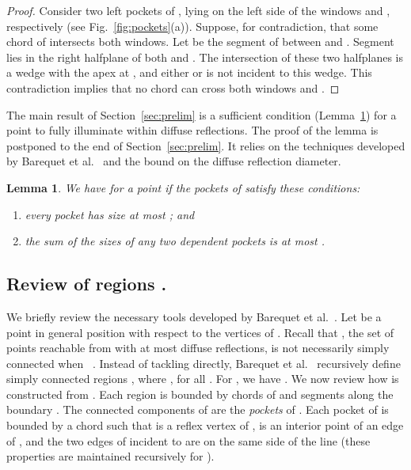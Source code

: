 \documentclass[12pt]{article}
\newtheorem{lemma}{Lemma}
\begin{document}
\begin{proof}
Consider two left pockets of , lying on the left side of the windows  and , respectively (see Fig.~\ref{fig:pockets}(a)). Suppose, for contradiction, that some chord  of  intersects both windows. Let  be the segment of  between  and . Segment  lies in the right halfplane of both  and . The intersection of these two halfplanes is a wedge with the apex at , and either  or  is not incident to this wedge.
This contradiction implies that no chord  can cross both windows  and .
\end{proof}
The main result of Section~\ref{sec:prelim} is a sufficient condition (Lemma~\ref{lem:condition})
for a point  to fully illuminate  within 
diffuse reflections.
The proof of the lemma is postponed to the end of Section~\ref{sec:prelim}.
It relies on the techniques developed by Barequet et al.~\cite{Us} and the bound
 on the diffuse reflection diameter.

\begin{lemma} \label{lem:condition}
We have 
for a point  if the pockets of 
satisfy these conditions:
\begin{enumerate}\itemsep -2pt
  \item[] every pocket has size at most ; and
  \item[] the sum of the sizes of any two dependent pockets is at most .
\end{enumerate}
\end{lemma}

\subsection{Review of regions .}

We briefly review the necessary tools developed by Barequet et al.~\cite{Us}. Let  be a point in general position with respect to the vertices of . Recall that , the set of points reachable from  with at most  diffuse reflections, is not necessarily simply connected when ~\cite{BPS04}. Instead of tackling  directly, Barequet et al.~\cite{Us} recursively define simply connected regions , where , for all . For , we have . We now review how  is constructed from . Each region  is bounded by chords of  and segments along the boundary . The connected components of  are the \emph{pockets} of . Each pocket  of  is bounded by a chord  such that  is a reflex vertex of ,  is an interior point of an edge of , and the two edges of  incident to  are on the same side of the line  (these properties are maintained recursively for ).
\end{document}
